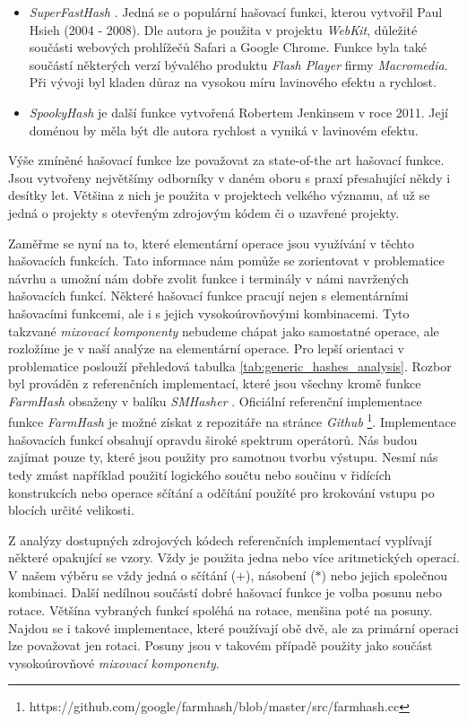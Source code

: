 \begin{itemize}
	\item \textit{SuperFastHash} \cite{Hsieh2004-2008}. Jedná se o populární hašovací funkci, kterou vytvořil Paul Hsieh (2004 - 2008). Dle autora je použita
		v projektu \textit{WebKit}, důležité součásti webových prohlížečů Safari a Google Chrome. Funkce byla také součástí
		některých verzí bývalého produktu \textit{Flash Player} firmy \textit{Macromedia}. Při vývoji byl kladen
		důraz na vysokou míru lavinového efektu a rychlost. 
		
	\item \textit{SpookyHash} \cite{Jenkins2012} je další funkce vytvořená Robertem Jenkinsem v roce 2011. Její doménou by měla být dle autora
		rychlost a vyniká v lavinovém efektu. 
\end{itemize}

Výše zmíněné hašovací funkce lze považovat za state-of-the art hašovací funkce. Jsou vytvořeny největšímy odborníky v daném
oboru s praxí přesahující někdy i desítky let. Většina z nich je použita v projektech velkého významu, ať už se jedná o
projekty s otevřeným zdrojovým kódem či o uzavřené projekty.

Zaměřme se nyní na to, které elementární operace jsou využívání v těchto hašovacích funkcích. Tato informace nám pomůže se
zorientovat v problematice návrhu a umožní nám dobře zvolit funkce i terminály v námi navržených hašovacích funkcí. Některé
hašovací funkce pracují nejen s elementárními hašovacími funkcemi, ale i s jejich vysokoúrovňovými kombinacemi. Tyto
takzvané \textit{mixovací komponenty} nebudeme chápat jako samostatné operace, ale rozložíme je v naší analýze na
elementární operace. Pro lepší orientaci v problematice poslouží přehledová tabulka \ref{tab:generic_hashes_analysis}.
Rozbor byl prováděn z referenčních implementací, které jsou všechny kromě funkce \textit{FarmHash} obsaženy v balíku
\textit{SMHasher} \cite{appleby2016}. Oficiální referenční implementace funkce \textit{FarmHash} je možné získat z repozitáře na
stránce \textit{Github} \footnote{https://github.com/google/farmhash/blob/master/src/farmhash.cc}. Implementace hašovacích
funkcí obsahují opravdu široké spektrum operátorů. Nás budou zajímat pouze ty, které jsou použity pro samotnou tvorbu
výstupu. Nesmí nás tedy zmást například použití logického součtu nebo součinu v řidících konstrukcích nebo operace
sčítání a odčítání použíté pro krokování vstupu po blocích určité velikosti. 

Z analýzy dostupných zdrojových kódech referenčních implementací vyplívají některé opakující se vzory.
Vždy je použita jedna nebo více aritmetických operací. V našem výběru se vždy jedná o sčítání ($+$), násobení  ($*$) nebo
jejich společnou kombinaci. Další nedílnou součástí dobré hašovací funkce je volba posunu nebo rotace. Většína vybraných
funkcí spoléhá na rotace, menšina poté na posuny. Najdou se i takové implementace, které používají obě dvě, ale za
primární operaci lze považovat jen rotaci. Posuny jsou v takovém případě použity jako součást vysokoúrovňové 
\textit{mixovací komponenty}.

